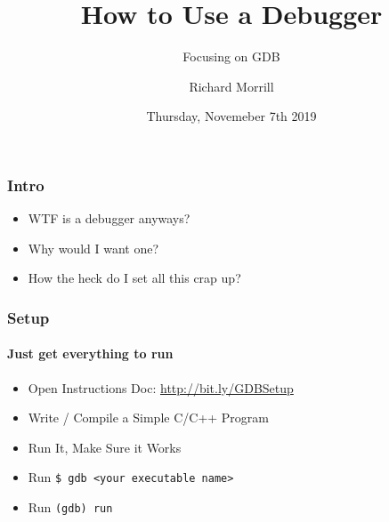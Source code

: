 \documentclass{beamer}
\title{How to Use a Debugger}
\subtitle{Focusing on GDB}
\author{Richard Morrill}
\institute{Fordham University CS Society}
\date{Thursday, Novemeber 7th 2019}
\newcommand{\code}{\texttt}
\begin{document}
\begin{frame}
\titlepage
\end{frame}

\begin{frame}
    \frametitle{Intro}

    \begin{itemize}
        \item WTF is a debugger anyways?
        \item Why would I want one?
        \item How the heck do I set all this crap up?
    \end{itemize}
\end{frame}

\begin{frame}
    \frametitle{Setup}
    \framesubtitle{Just get everything to run}
    \begin{itemize}
        \item Open Instructions Doc: \url{http://bit.ly/GDBSetup}
        \item Write / Compile a Simple C/C++ Program
        \item Run It, Make Sure it Works
        \item Run \code{\$ gdb <your executable name>}
        \item Run \code{(gdb) run}
    \end{itemize}

\end{frame}
\end{document}
